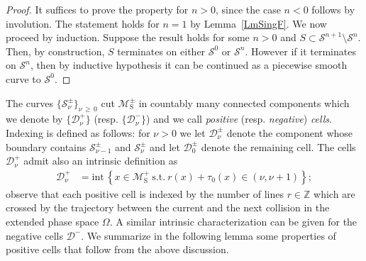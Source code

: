 \documentclass[10pt]{amsart}
\theoremstyle{definition}\newtheorem{defi}[theo]{Definition}\newtheorem{rema}[theo]{Remark}\newtheorem{exam}[theo]{Example}\newtheorem{exem}[theo]{Example}\newtheorem{nota}[theo]{Notation}
\newcommand{\ct}{r}
\newcommand{\fft}{\tau}
\newcommand{\st}{\ \text{s.t.}\ }
\newcommand{\intr}[1]{\mathrm{int}\,#1}
\newcommand{\bZ}{\mathbb{Z}}
\newcommand{\cell}{\mathcal{D}}
\newcommand{\csp}{\mathcal{M}}
\newcommand{\csps}{\csp_\text{S}}
\newcommand{\exph}{\Omega}
\newcommand{\singPrivate}{\mathcal{S}}
\newcommand{\sing}[1]{\singPrivate^{#1}}
\newcommand{\singBoth}{\singPrivate^\pm}
\newcommand{\indCell}{\nu}
\begin{document}
\begin{proof}
It suffices to prove the property for $n > 0$, since the case $n < 0$ follows by involution. The statement holds for $n = 1$ by Lemma~\ref{LmSingF}. {We now proceed by induction. Suppose the result holds for some $n>0$ and} $S\subset\sing {n+1}\setminus\sing n$. {Then, by construction}, $S$ terminates on either $\sing0$ or $\sing n$. However if it terminates on $\sing n$, then by inductive hypothesis it can be continued as a piecewise smooth curve to $\sing 0$.
\end{proof}

The curves $\{\singBoth_{\indCell}\}_{\indCell\,\ge\,0}$ cut $\csps^\pm$ in countably many connected components which we denote by $\{\cell^+_\indCell\}$ (resp. $\{\cell^-_\indCell\}$) and we call
\emph{positive} (resp. \emph{negative}) \emph{cells}. Indexing is defined as follows: for $\indCell > 0$ we let $\cell^\pm_\indCell$ denote the component whose boundary contains $\singBoth_{\indCell-1}$ and $\singBoth_{\indCell}$ and let $\cell^\pm_0$ denote the remaining cell. The cells $\cell^+_\indCell$ admit also an intrinsic definition as
\begin{align}\label{e_defCell}
\cell^+_\indCell &= \intr\left\{x\in\csps^+ \st \ct(x)+\fft_0(x)\in(\indCell,\indCell+1)\right\};
\end{align}
observe that each positive cell is indexed by the number of lines $\ct \in \bZ$ which are crossed by the trajectory between the current and the next collision in the extended phase space $\exph$. A similar intrinsic characterization can be given for the negative cells $\cell^-$. We summarize in the following lemma some properties of positive cells that follow from the above discussion.
\end{document}
